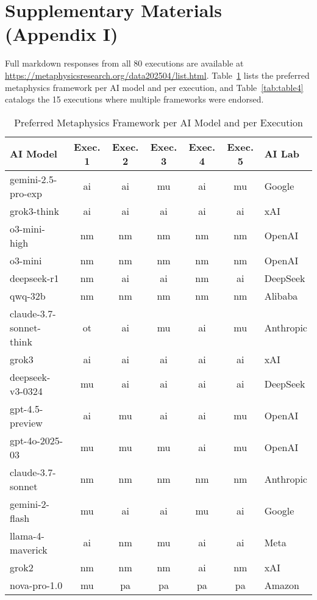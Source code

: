 \documentclass[11pt]{article}
\begin{document}
\appendix

\section{Supplementary Materials (Appendix I)}
Full markdown responses from all 80 executions are available at \url{https://metaphysicsresearch.org/data202504/list.html}. Table~\ref{tab:table3} lists the preferred metaphysics framework per AI model and per execution, and Table~\ref{tab:table4} catalogs the 15 executions where multiple frameworks were endorsed.

\begin{table}[ht!]
\centering
\caption{Preferred Metaphysics Framework per AI Model and per Execution}
\label{tab:table3}
\begin{tabular}{lcccccl}
\toprule
\textbf{AI Model} & \textbf{Exec. 1} & \textbf{Exec. 2} & \textbf{Exec. 3} & \textbf{Exec. 4} & \textbf{Exec. 5} & \textbf{AI Lab} \\
\midrule
gemini-2.5-pro-exp      & ai & ai & mu & ai & mu & Google \\
grok3-think            & ai & ai & ai & ai & ai & xAI \\
o3-mini-high           & nm & nm & nm & nm & nm & OpenAI \\
o3-mini                & nm & nm & nm & nm & nm & OpenAI \\
deepseek-r1            & nm & ai & ai & nm & ai & DeepSeek \\
qwq-32b                & nm & nm & nm & nm & nm & Alibaba \\
claude-3.7-sonnet-think& ot & ai & mu & ai & mu & Anthropic \\
grok3                  & ai & ai & ai & ai & ai & xAI \\
deepseek-v3-0324       & mu & ai & ai & ai & ai & DeepSeek \\
gpt-4.5-preview        & ai & mu & ai & ai & mu & OpenAI \\
gpt-4o-2025-03         & mu & mu & mu & ai & mu & OpenAI \\
claude-3.7-sonnet      & nm & nm & nm & nm & nm & Anthropic \\
gemini-2-flash         & mu & ai & ai & mu & ai & Google \\
llama-4-maverick       & ai & nm & mu & ai & ai & Meta \\
grok2                  & nm & nm & nm & ai & nm & xAI \\
nova-pro-1.0           & mu & pa & pa & pa & pa & Amazon \\
\bottomrule
\end{tabular}
\end{table}
\end{document}
